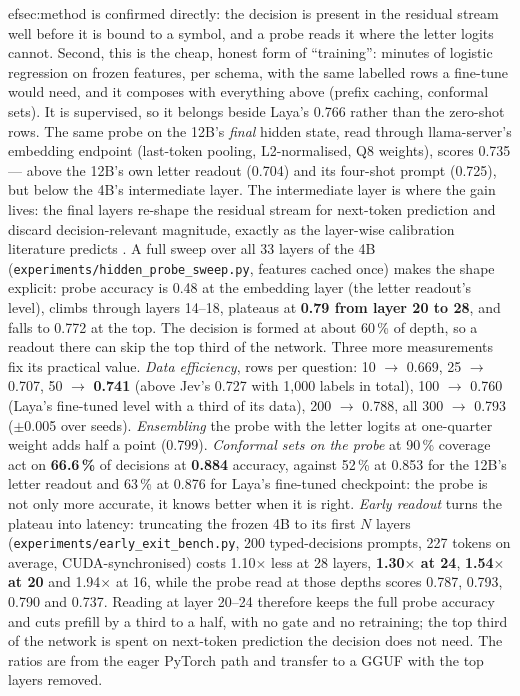 \documentclass[11pt,a4paper]{article}
\newcommand{\code}[1]{\texttt{#1}}
\begin{document}
ef{sec:method} is confirmed directly: the decision is present in the residual stream well before it is bound to a symbol, and a probe reads it where the letter logits cannot. Second, this is the cheap, honest form of ``training'': minutes of logistic regression on frozen features, per schema, with the same labelled rows a fine-tune would need, and it composes with everything above (prefix caching, conformal sets). It is supervised, so it belongs beside Laya's 0.766 rather than the zero-shot rows. The same probe on the 12B's \emph{final} hidden state, read through llama-server's embedding endpoint (last-token pooling, L2-normalised, Q8 weights), scores 0.735 --- above the 12B's own letter readout (0.704) and its four-shot prompt (0.725), but below the 4B's intermediate layer. The intermediate layer is where the gain lives: the final layers re-shape the residual stream for next-token prediction and discard decision-relevant magnitude, exactly as the layer-wise calibration literature predicts \cite{calm}. A full sweep over all 33 layers of the 4B (\code{experiments/hidden\_probe\_sweep.py}, features cached once) makes the shape explicit: probe accuracy is 0.48 at the embedding layer (the letter readout's level), climbs through layers 14--18, plateaus at \textbf{0.79 from layer 20 to 28}, and falls to 0.772 at the top. The decision is formed at about 60\,\% of depth, so a readout there can skip the top third of the network. Three more measurements fix its practical value. \emph{Data efficiency}, rows per question: 10 $\to$ 0.669, 25 $\to$ 0.707, 50 $\to$ \textbf{0.741} (above Jev's 0.727 with 1,000 labels in total), 100 $\to$ 0.760 (Laya's fine-tuned level with a third of its data), 200 $\to$ 0.788, all 300 $\to$ 0.793 ($\pm$0.005 over seeds). \emph{Ensembling} the probe with the letter logits at one-quarter weight adds half a point (0.799). \emph{Conformal sets on the probe} at 90\,\% coverage act on \textbf{66.6\,\%} of decisions at \textbf{0.884} accuracy, against 52\,\% at 0.853 for the 12B's letter readout and 63\,\% at 0.876 for Laya's fine-tuned checkpoint: the probe is not only more accurate, it knows better when it is right. \emph{Early readout} turns the plateau into latency: truncating the frozen 4B to its first $N$ layers (\code{experiments/early\_exit\_bench.py}, 200 typed-decisions prompts, 227 tokens on average, CUDA-synchronised) costs 1.10$\times$ less at 28 layers, \textbf{1.30$\times$ at 24}, \textbf{1.54$\times$ at 20} and 1.94$\times$ at 16, while the probe read at those depths scores 0.787, 0.793, 0.790 and 0.737. Reading at layer 20--24 therefore keeps the full probe accuracy and cuts prefill by a third to a half, with no gate and no retraining; the top third of the network is spent on next-token prediction the decision does not need. The ratios are from the eager PyTorch path and transfer to a GGUF with the top layers removed.
\end{document}
